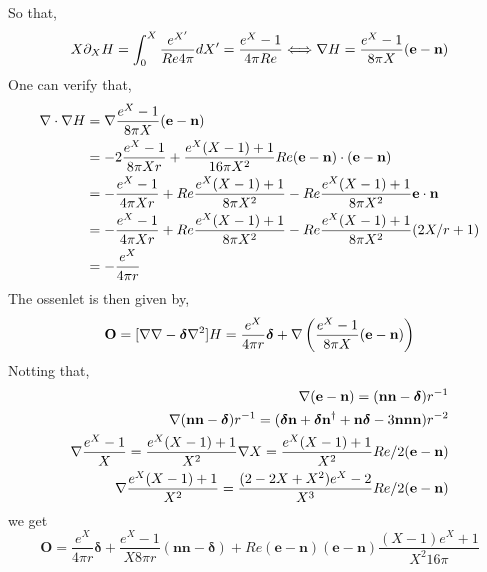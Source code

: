 So that,
\begin{equation}
    X \partial_X H =\int_0^X  \frac{e^{X'}}{Re 4\pi} dX' = \frac{e^X- 1}{4\pi Re}
    \Longleftrightarrow 
    \mathbf{\nabla} H = \frac{e^X- 1}{8\pi X} (\textbf{e}-\textbf{n})
\end{equation}
One can verify that, 
\begin{align}
    \mathbf{\nabla}\cdot \mathbf{\nabla} H 
    &=
    \mathbf{\nabla} \frac{e^X- 1}{8\pi X} (\textbf{e}-\textbf{n})\\
    &=
    -2\frac{e^X- 1}{8\pi X r} 
    +
    \frac{e^X(X-1)+ 1}{16 \pi X^2 }Re(\textbf{e}-\textbf{n})\cdot (\textbf{e}- \textbf{n})\\
    &=
    -\frac{e^X- 1}{4\pi X r} 
    +
    Re\frac{e^X(X-1)+ 1}{8 \pi X^2 }
    -
    Re\frac{e^X(X-1)+ 1}{8 \pi X^2 } \textbf{e}\cdot \textbf{n}\\
    &=
    -\frac{e^X- 1}{4\pi X r} 
    +
    Re\frac{e^X(X-1)+ 1}{8 \pi X^2 }
    -
    Re\frac{e^X(X-1)+ 1}{8 \pi X^2 } (2X/r + 1)\\
    &=
    -
    \frac{e^X}{4 \pi  r} \\
\end{align}
The ossenlet is then given by, 
\begin{equation}
    \textbf{O}
    = [\mathbf{\nabla}\mathbf{\nabla} - \bm\delta\mathbf{\nabla}^2] H 
    = 
    \frac{e^{X}}{4\pi r}\bm\delta
    +\mathbf{\nabla} \left(\frac{e^X- 1}{8\pi X} (\textbf{e}-\textbf{n})\right)
\end{equation}
Notting that,
\begin{align}    
    \mathbf{\nabla} (\textbf{e}- \textbf{n}) = (\textbf{nn} - \bm\delta ) r^{-1}\\
    \mathbf{\nabla} (\textbf{nn} - \bm\delta ) r^{-1} = (\bm\delta \textbf{n}+ \bm\delta \textbf{n}^\dagger + \textbf{n}\bm\delta - 3 \textbf{nnn}) r^{-2}\\
    \mathbf{\nabla} \frac{e^X- 1}{X} = \frac{e^X(X-1)+1}{X^2}\mathbf{\nabla} X
    = \frac{e^X(X-1)+1}{X^2} Re/2 (\textbf{e}- \textbf{n})\\
    \mathbf{\nabla} \frac{e^X(X-1)+1}{X^2} 
    = \frac{(2-2X+X^2) e^X-2}{X^3} Re/2 (\textbf{e}- \textbf{n})\\
\end{align}
we get
\begin{equation}
    \textbf{O} =
    \frac{e^X}{4\pi r}\bm\delta
    + \frac{e^X-1}{X 8 \pi r}  ( \textbf{nn} -\bm\delta)
    + 
    Re (\textbf{e} - \textbf{n})
    (\textbf{e} - \textbf{n})
    \frac{(X-1) e^X + 1}{X^2 16 \pi}
\end{equation}
